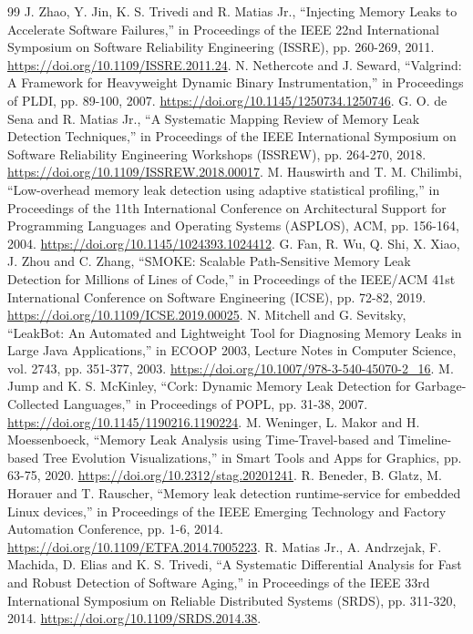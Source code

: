 \documentclass[10pt,a4paper,twocolumn]{article}
\begin{document}
\begin{thebibliography}{99}
 J. Zhao, Y. Jin, K. S. Trivedi and R. Matias Jr., ``Injecting Memory Leaks to Accelerate Software Failures,'' in Proceedings of the IEEE 22nd International Symposium on Software Reliability Engineering (ISSRE), pp. 260-269, 2011. \url{https://doi.org/10.1109/ISSRE.2011.24}.
 N. Nethercote and J. Seward, ``Valgrind: A Framework for Heavyweight Dynamic Binary Instrumentation,'' in Proceedings of PLDI, pp. 89-100, 2007. \url{https://doi.org/10.1145/1250734.1250746}.
 G. O. de Sena and R. Matias Jr., ``A Systematic Mapping Review of Memory Leak Detection Techniques,'' in Proceedings of the IEEE International Symposium on Software Reliability Engineering Workshops (ISSREW), pp. 264-270, 2018. \url{https://doi.org/10.1109/ISSREW.2018.00017}.
 M. Hauswirth and T. M. Chilimbi, ``Low-overhead memory leak detection using adaptive statistical profiling,'' in Proceedings of the 11th International Conference on Architectural Support for Programming Languages and Operating Systems (ASPLOS), ACM, pp. 156-164, 2004. \url{https://doi.org/10.1145/1024393.1024412}.
 G. Fan, R. Wu, Q. Shi, X. Xiao, J. Zhou and C. Zhang, ``SMOKE: Scalable Path-Sensitive Memory Leak Detection for Millions of Lines of Code,'' in Proceedings of the IEEE/ACM 41st International Conference on Software Engineering (ICSE), pp. 72-82, 2019. \url{https://doi.org/10.1109/ICSE.2019.00025}.
 N. Mitchell and G. Sevitsky, ``LeakBot: An Automated and Lightweight Tool for Diagnosing Memory Leaks in Large Java Applications,'' in ECOOP 2003, Lecture Notes in Computer Science, vol. 2743, pp. 351-377, 2003. \url{https://doi.org/10.1007/978-3-540-45070-2_16}.
 M. Jump and K. S. McKinley, ``Cork: Dynamic Memory Leak Detection for Garbage-Collected Languages,'' in Proceedings of POPL, pp. 31-38, 2007. \url{https://doi.org/10.1145/1190216.1190224}.
 M. Weninger, L. Makor and H. Moessenboeck, ``Memory Leak Analysis using Time-Travel-based and Timeline-based Tree Evolution Visualizations,'' in Smart Tools and Apps for Graphics, pp. 63-75, 2020. \url{https://doi.org/10.2312/stag.20201241}.
 R. Beneder, B. Glatz, M. Horauer and T. Rauscher, ``Memory leak detection runtime-service for embedded Linux devices,'' in Proceedings of the IEEE Emerging Technology and Factory Automation Conference, pp. 1-6, 2014. \url{https://doi.org/10.1109/ETFA.2014.7005223}.
 R. Matias Jr., A. Andrzejak, F. Machida, D. Elias and K. S. Trivedi, ``A Systematic Differential Analysis for Fast and Robust Detection of Software Aging,'' in Proceedings of the IEEE 33rd International Symposium on Reliable Distributed Systems (SRDS), pp. 311-320, 2014. \url{https://doi.org/10.1109/SRDS.2014.38}.

\end{thebibliography}
\end{document}
